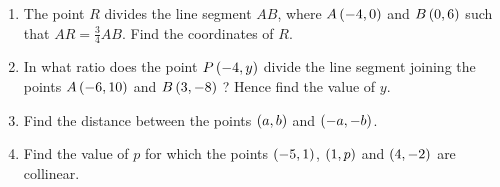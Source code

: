 \begin{enumerate}
\item The point $R$ divides the line segment $AB$, where $A\left(- 4, 0\right)$ and $B\left(0, 6\right)$ such that $AR=\frac{3}{4} AB$. Find the coordinates of $R$.

\item In what ratio does the point $P\left(- 4, y\right)$ divide the line segment joining the points $A\left(- 6, 10\right)$ and $B\left(3, - 8\right)$ ? Hence find the value of $y$.

\item Find the distance between the points $\left(a, b\right)$ and $\left(-a, -b\right)$.

\item Find the value of $p$ for which the points $\left(-5, 1\right)$, $\left(1, p\right)$ and $\left(4, -2\right)$ are collinear.
\end{enumerate}

